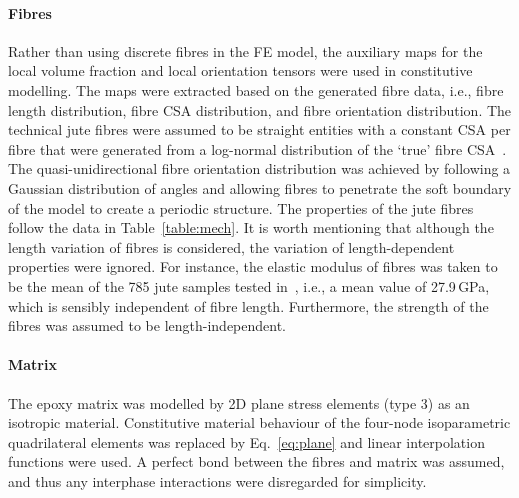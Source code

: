 	\paragraph{Fibres} Rather than using discrete fibres in the FE model, the auxiliary maps for the local volume fraction and local orientation tensors were used in constitutive modelling. The maps were extracted based on the generated fibre data, i.e., fibre length distribution, fibre CSA distribution, and fibre orientation distribution. The technical jute fibres were assumed to be straight entities with a constant CSA per fibre that were generated from a log-normal distribution of the `true' fibre CSA~\autocite{Virk.2010b}. The quasi-unidirectional fibre orientation distribution was achieved by following a Gaussian distribution of angles and allowing fibres to penetrate the soft boundary of the model to create a periodic structure. The properties of the jute fibres follow the data in Table~\ref{table:mech}. It is worth mentioning that although the length variation of fibres is considered, the variation of length-dependent properties were ignored. For instance, the elastic modulus of fibres was taken to be the mean of the 785 jute samples tested in~\autocite{Virk.2013}, i.e., a mean value of 27.9\,GPa, which is sensibly independent of fibre length. Furthermore, the strength of the fibres was assumed to be length-independent.
		
	\paragraph{Matrix} The epoxy matrix was modelled by 2D plane stress elements (type 3) as an isotropic material. Constitutive material behaviour of the four-node isoparametric quadrilateral elements was replaced by Eq.~\eqref{eq:plane} and linear interpolation functions were used. A perfect bond between the fibres and matrix was assumed, and thus any interphase interactions were disregarded for simplicity.
	
